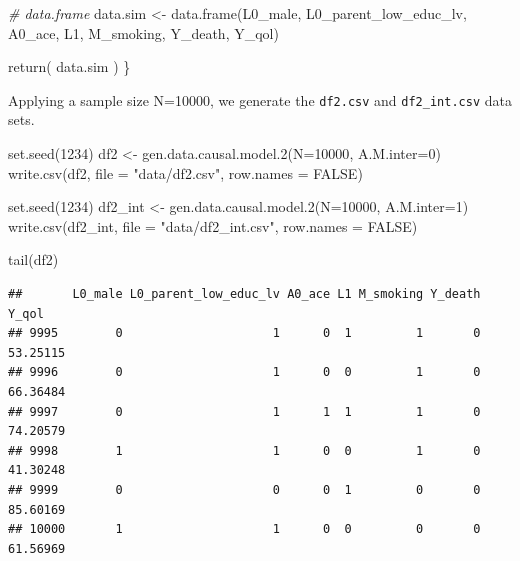 \documentclass[
]{book}
\newenvironment{Shaded}{\begin{snugshade}}{\end{snugshade}}
\newcommand{\AttributeTok}[1]{\textcolor[rgb]{0.77,0.63,0.00}{#1}}
\newcommand{\CommentTok}[1]{\textcolor[rgb]{0.56,0.35,0.01}{\textit{#1}}}
\newcommand{\ConstantTok}[1]{\textcolor[rgb]{0.00,0.00,0.00}{#1}}
\newcommand{\DecValTok}[1]{\textcolor[rgb]{0.00,0.00,0.81}{#1}}
\newcommand{\FunctionTok}[1]{\textcolor[rgb]{0.00,0.00,0.00}{#1}}
\newcommand{\NormalTok}[1]{#1}
\newcommand{\OtherTok}[1]{\textcolor[rgb]{0.56,0.35,0.01}{#1}}
\newcommand{\StringTok}[1]{\textcolor[rgb]{0.31,0.60,0.02}{#1}}
\begin{document}
\begin{Shaded}
\begin{Highlighting}[]
  \CommentTok{\# data.frame}
\NormalTok{  data.sim }\OtherTok{\textless{}{-}} \FunctionTok{data.frame}\NormalTok{(L0\_male, L0\_parent\_low\_educ\_lv, A0\_ace, L1, M\_smoking, }
\NormalTok{                         Y\_death, Y\_qol)}

  \FunctionTok{return}\NormalTok{( data.sim )}
\NormalTok{\}}
\end{Highlighting}
\end{Shaded}

Applying a sample size N=10000, we generate the \texttt{df2.csv} and \texttt{df2\_int.csv} data sets.

\begin{Shaded}
\begin{Highlighting}[]
\FunctionTok{set.seed}\NormalTok{(}\DecValTok{1234}\NormalTok{)}
\NormalTok{df2 }\OtherTok{\textless{}{-}} \FunctionTok{gen.data.causal.model.2}\NormalTok{(}\AttributeTok{N=}\DecValTok{10000}\NormalTok{, }\AttributeTok{A.M.inter=}\DecValTok{0}\NormalTok{)}
\FunctionTok{write.csv}\NormalTok{(df2, }\AttributeTok{file =} \StringTok{"data/df2.csv"}\NormalTok{, }\AttributeTok{row.names =} \ConstantTok{FALSE}\NormalTok{)}

\FunctionTok{set.seed}\NormalTok{(}\DecValTok{1234}\NormalTok{)}
\NormalTok{df2\_int }\OtherTok{\textless{}{-}} \FunctionTok{gen.data.causal.model.2}\NormalTok{(}\AttributeTok{N=}\DecValTok{10000}\NormalTok{, }\AttributeTok{A.M.inter=}\DecValTok{1}\NormalTok{)}
\FunctionTok{write.csv}\NormalTok{(df2\_int, }\AttributeTok{file =} \StringTok{"data/df2\_int.csv"}\NormalTok{, }\AttributeTok{row.names =} \ConstantTok{FALSE}\NormalTok{)}
\end{Highlighting}
\end{Shaded}

\begin{Shaded}
\begin{Highlighting}[]
\FunctionTok{tail}\NormalTok{(df2)}
\end{Highlighting}
\end{Shaded}

\begin{verbatim}
##       L0_male L0_parent_low_educ_lv A0_ace L1 M_smoking Y_death    Y_qol
## 9995        0                     1      0  1         1       0 53.25115
## 9996        0                     1      0  0         1       0 66.36484
## 9997        0                     1      1  1         1       0 74.20579
## 9998        1                     1      0  0         1       0 41.30248
## 9999        0                     0      0  1         0       0 85.60169
## 10000       1                     1      0  0         0       0 61.56969
\end{verbatim}
\end{document}
